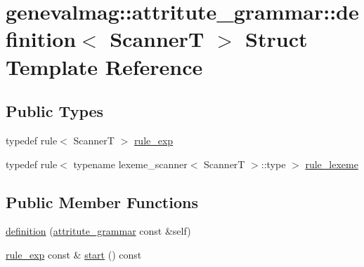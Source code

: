\hypertarget{structgenevalmag_1_1attritute__grammar_1_1definition}{
\section{genevalmag::attritute\_\-grammar::definition$<$ ScannerT $>$ Struct Template Reference}
\label{structgenevalmag_1_1attritute__grammar_1_1definition}
}
\subsection*{Public Types}
\begin{DoxyCompactItemize}
\item 
typedef rule$<$ ScannerT $>$ \hyperlink{structgenevalmag_1_1attritute__grammar_1_1definition_ad75a846c3e97a2c46de6cc7bafe5cd86}{rule\_\-exp}
\item 
typedef rule$<$ typename lexeme\_\-scanner$<$ ScannerT $>$::type $>$ \hyperlink{structgenevalmag_1_1attritute__grammar_1_1definition_ae8f879e64d097084c7b09ca23778b66b}{rule\_\-lexeme}
\end{DoxyCompactItemize}
\subsection*{Public Member Functions}
\begin{DoxyCompactItemize}
\item 
\hyperlink{structgenevalmag_1_1attritute__grammar_1_1definition_a77a5f8d316d607055d02312370c825cc}{definition} (\hyperlink{structgenevalmag_1_1attritute__grammar}{attritute\_\-grammar} const \&self)
\item 
\hyperlink{structgenevalmag_1_1attritute__grammar_1_1definition_ad75a846c3e97a2c46de6cc7bafe5cd86}{rule\_\-exp} const \& \hyperlink{structgenevalmag_1_1attritute__grammar_1_1definition_af3478aad9726ea5ca5502c847beff9ea}{start} () const 
\end{DoxyCompactItemize}
